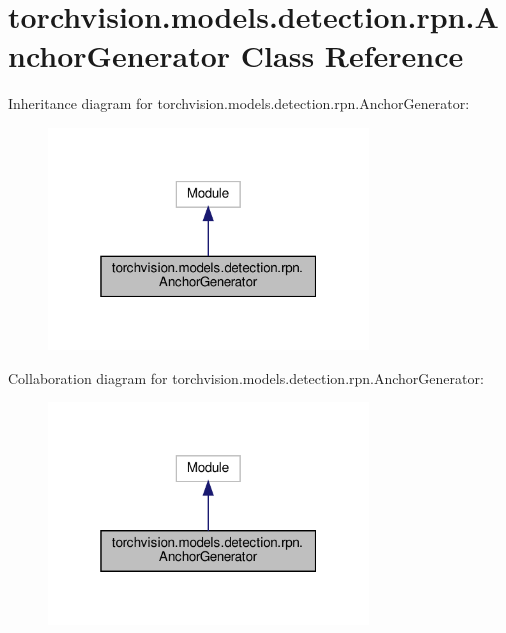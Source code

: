 \hypertarget{classtorchvision_1_1models_1_1detection_1_1rpn_1_1AnchorGenerator}{}\section{torchvision.\+models.\+detection.\+rpn.\+Anchor\+Generator Class Reference}
\label{classtorchvision_1_1models_1_1detection_1_1rpn_1_1AnchorGenerator}


Inheritance diagram for torchvision.\+models.\+detection.\+rpn.\+Anchor\+Generator\+:
\nopagebreak
\begin{figure}[H]
\begin{center}
\leavevmode
\includegraphics[width=241pt]{classtorchvision_1_1models_1_1detection_1_1rpn_1_1AnchorGenerator__inherit__graph}
\end{center}
\end{figure}


Collaboration diagram for torchvision.\+models.\+detection.\+rpn.\+Anchor\+Generator\+:
\nopagebreak
\begin{figure}[H]
\begin{center}
\leavevmode
\includegraphics[width=241pt]{classtorchvision_1_1models_1_1detection_1_1rpn_1_1AnchorGenerator__coll__graph}
\end{center}
\end{figure}
